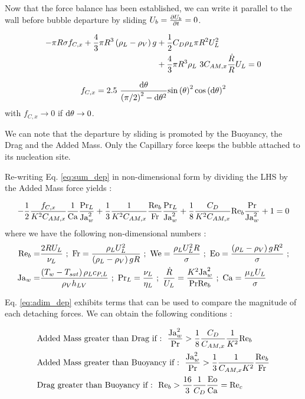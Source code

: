 Now that the force balance has been established, we can write it parallel to the wall before bubble departure by sliding \ie $U_{b}=\frac{\partial{U_{b}}}{\partial t}=0$.

\begin{align}
\label{eq:sum_dep}
\nonumber - \pi R\sigma f_{C,x} + \frac{4}{3}\pi R^{3}\left( \rho_{L}-\rho_{V} \right)g &+ \frac{1}{2}C_{D}\rho_{L}\pi R^{2} U_{L}^{2} \\
& + \frac{4}{3}\pi R^{3}\rho_{L}~3C_{AM,x}\frac{\dot{R}}{R}U_{L} = 0
\end{align}

\begin{equation}
 f_{C,x}=2.5\ \frac{\mathrm{d}\theta}{\left( \pi/2 \right)^{2}-\mathrm{d}\theta^{2}}\mathrm{sin}\left( \theta \right)^{2}\mathrm{cos}\left( \mathrm{d}\theta \right)^{2}
\end{equation}
with $f_{C,x} \to 0 $ if $\mathrm{d}\theta \to 0$.


We can note that the departure by sliding is promoted by the Buoyancy, the Drag and the Added Mass. Only the Capillary force keeps the bubble attached to its nucleation site.


\npar
Re-writing Eq. \ref{eq:sum_dep} in non-dimensional form by dividing the LHS by the Added Mass force yields :

\begin{equation}
\label{eq:adim_dep}
-\frac{1}{2}\frac{f_{C,x}}{K^{2}C_{AM,x}}\frac{1}{\mathrm{Ca}}\frac{\mathrm{Pr}_{L}}{\mathrm{Ja}_{w}^{2}} +  \frac{1}{3}\frac{1}{K^{2}C_{AM,x}}\frac{\mathrm{Re}_{b}}{\mathrm{Fr}}\frac{\mathrm{Pr}_{L}}{\mathrm{Ja}_{w}^{2}} + \frac{1}{8}\frac{C_{D}}{K^{2}C_{AM,x}}\mathrm{Re}_{b}\frac{\mathrm{Pr}}{\mathrm{Ja}_{w}^{2}} +1 =0
\end{equation}
where we have the following non-dimensional numbers :
\begin{align}
\nonumber \Re_{b} =& \frac{2RU_{L}}{\nu_{L}}\ ;\ \Fr=\frac{\rho_{L}U_{L}^{2}}{\parth{\rho_{L}-\rho_{V}}g R}\ ;\ \We=\frac{\rho_{L}U_{L}^{2}R}{\sigma}\ ; \ \Eo=\frac{\parth{\rho_{L}-\rho_{V}}g R^{2}}{\sigma}\ ;\\
%
\nonumber \Ja_{w}=&\frac{\parth{T_{w}-T_{sat}}\rho_{L} c_{P,L}}{\rho_{V} h_{LV}}\ ;\ \Pr_{L}=\frac{\nu_{L}}{\eta_{L}}\ ;\ \frac{\dot{R}}{U_{L}}=\frac{K^{2}\Ja_{w}^{2}}{\Pr \Re_{b}}\ ;\ \Ca=\frac{\mu_{L}U_{L}}{\sigma}
\end{align}


Eq. \ref{eq:adim_dep} exhibits terms that can be used to compare the magnitude of each detaching forces. We can obtain the following conditions :

\begin{align}
&\text{Added Mass greater than Drag if :}\ \ \frac{\mathrm{Ja}_{w}^{2}}{\mathrm{Pr}}>\frac{1}{8}\frac{C_{D}}{C_{AM,x}}\frac{1}{K^{2}}\mathrm{Re}_{b} \label{eq:AMvsD}\\
&\text{Added Mass greater than Buoyancy if :}\ \  \frac{\mathrm{Ja}_{w}^{2}}{\mathrm{Pr}}>\frac{1}{3}\frac{1}{C_{AM,x}K^{2}}\frac{\mathrm{Re}_{b}}{\mathrm{Fr}} \label{eq:AMvsB}\\
&\text{Drag greater than Buoyancy if :}\ \  \mathrm{Re}_{b}>\frac{16}{3}\frac{1}{C_{D}}\frac{\mathrm{Eo}}{\mathrm{Ca}}=\mathrm{Re}_{c} \label{eq:DvsB}
\end{align}


